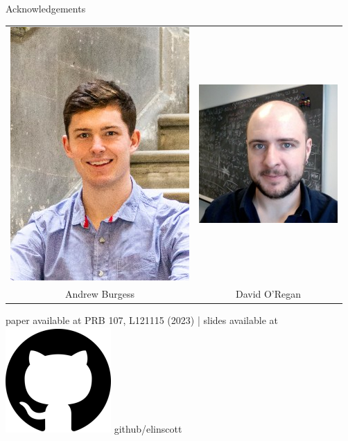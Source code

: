 \documentclass[xcolor=table,aspectratio=169]{beamer}
\numberwithin{equation}{section}
\begin{document}
\begin{frame}{Acknowledgements}

   \begin{center}
      \footnotesize
      \begin{tabularx}{0.5\textwidth}{CC}
         \includegraphics[height = 0.4\paperheight]{photos/andrew_burgess.png}     &
         \includegraphics[height = 0.4\paperheight]{figures/david_oregan.jpg}    \\
         Andrew Burgess                                                             &
         David O'Regan                                                             \\
      \end{tabularx}
   \end{center}

   \vspace{1ex}
   \begin{center}
      paper available at PRB 107, L121115 (2023) | slides available at \includegraphics[height=\fontcharht\font`\B]{logos/github-favicon.png} github/elinscott
   \end{center}



\end{frame}
\end{document}
